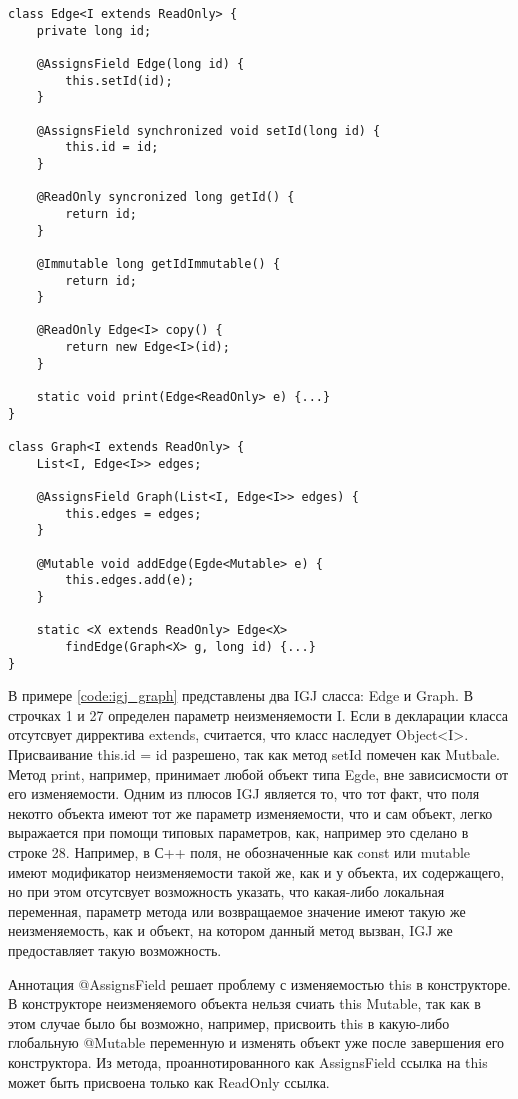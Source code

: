 \begin{lstlisting}[caption=Пример использования IGJ, label=code:igj_graph]
class Edge<I extends ReadOnly> {
    private long id;
    
    @AssignsField Edge(long id) {
        this.setId(id);
    }
    
    @AssignsField synchronized void setId(long id) {
        this.id = id;
    }
    
    @ReadOnly syncronized long getId() {
        return id;
    }
    
    @Immutable long getIdImmutable() {
        return id;
    }
    
    @ReadOnly Edge<I> copy() {
        return new Edge<I>(id);
    }
    
    static void print(Edge<ReadOnly> e) {...}
}

class Graph<I extends ReadOnly> {
    List<I, Edge<I>> edges;
    
    @AssignsField Graph(List<I, Edge<I>> edges) {
        this.edges = edges;
    }
    
    @Mutable void addEdge(Egde<Mutable> e) {
        this.edges.add(e);
    }
    
    static <X extends ReadOnly> Edge<X> 
        findEdge(Graph<X> g, long id) {...}
}
\end{lstlisting}

В примере \ref{code:igj_graph} представлены два IGJ сласса: Edge и Graph. В строчках 1 и 27 определен параметр неизменяемости I. Если в декларации класса отсутсвует дирректива extends, считается, что класс наследует Object<I>. Присваивание this.id = id разрешено, так как метод setId помечен как Mutbale. Метод print, например, принимает любой объект типа Egde, вне зависисмости от его изменяемости. Одним из плюсов IGJ является то, что тот факт, что поля некотго объекта имеют тот же параметр изменяемости, что и сам объект, легко выражается при помощи типовых параметров, как, например это сделано в строке 28. Например, в С++ поля, не обозначенные как const или mutable имеют модификатор неизменяемости такой же, как и у объекта, их содержащего, но при этом отсутсвует возможность указать, что какая-либо локальная переменная, параметр метода или возвращаемое значение имеют такую же неизменяемость, как и объект, на котором данный метод вызван, IGJ же предоставляет такую возможность.

Аннотация @AssignsField решает проблему с изменяемостью this в конструкторе. В конструкторе неизменяемого объекта нельзя счиать this Mutable, так как в этом случае было бы возможно, например, присвоить this в какую-либо глобальную @Mutable переменную и изменять объект уже после завершения его конструктора. Из метода, проаннотированного как AssignsField ссылка на this может быть присвоена только как ReadOnly ссылка. 

